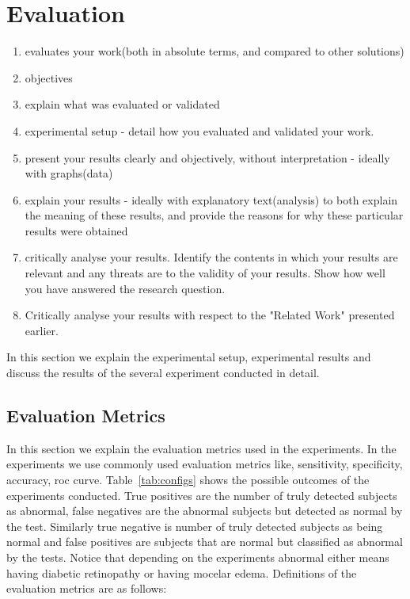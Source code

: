 \chapter{Evaluation}

\begin{enumerate}
    \item evaluates your work(both in absolute terms, and compared to other solutions)
    \item objectives
    \item explain what was evaluated or validated
    \item experimental setup - detail how you evaluated and validated your work.
    \item present your results clearly and objectively, without interpretation - ideally with graphs(data)
    \item explain your results - ideally with explanatory text(analysis) to both explain the meaning of these results, and provide the reasons for why these particular results were obtained
    \item critically analyse your results. Identify the contents in which your results are relevant and any threats are to the validity of your results. Show how well you have answered the research question.
    \item Critically analyse your results with respect to the "Related Work" presented earlier.
\end{enumerate}

In this section we explain the experimental setup, experimental results and discuss the results of the several experiment conducted in detail. 

\section{Evaluation Metrics}
In this section we explain the evaluation metrics used in the experiments. In the experiments we use commonly used evaluation metrics like, sensitivity, specificity, accuracy, roc curve. Table~\ref{tab:configs} shows the possible outcomes of the experiments conducted. True positives are the number of truly detected subjects as abnormal, false negatives are the abnormal subjects but detected as normal by the test. Similarly true negative is number of truly detected subjects as being normal and false positives are subjects that are normal but classified as abnormal by the tests. Notice that depending on the experiments abnormal either means having diabetic retinopathy or having mocelar edema. Definitions of the evaluation metrics are as follows: 

